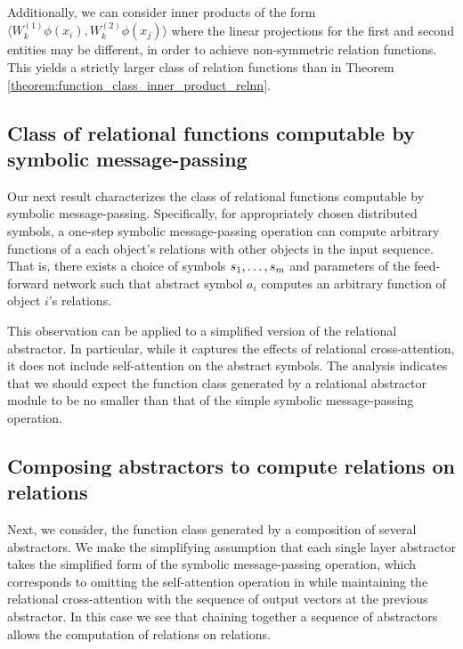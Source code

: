 Additionally, we can consider inner products of the form
$\langle W_k^{(1)} \phi(x_i), W_k^{(2)} \phi(x_j) \rangle$
where the linear projections for the first and second entities may be different, in order to achieve non-symmetric relation functions. This yields a strictly larger class of relation functions than in Theorem \ref{theorem:function_class_inner_product_relnn}.

\subsection{Class of relational functions computable by symbolic message-passing}

Our next result characterizes the class of relational functions computable by symbolic message-passing.
Specifically, for appropriately chosen distributed symbols, 
a one-step symbolic message-passing operation can compute arbitrary functions of a each object's relations with other objects in the input sequence. That is, there exists a choice of symbols \(s_1, \ldots, s _m\) and parameters of the feed-forward network such that abstract symbol \(a_i\) computes an arbitrary function of object \(i\)'s relations.

This observation can be applied to a simplified version of the relational  abstractor. In particular, while it captures the effects of relational cross-attention, it does not include self-attention on the abstract symbols. The analysis indicates that we should expect the function class generated by a relational  abstractor module to be no smaller than that of the simple symbolic message-passing operation.


\subsection{Composing  abstractors to compute relations on relations}
\label{ssec:compsing_abstractors}

Next, we consider, 
the function class generated by a composition of several abstractors. We make the simplifying assumption that each single layer abstractor takes the simplified form of the symbolic message-passing operation, which corresponds to omitting the self-attention operation in  while maintaining the relational cross-attention with the sequence of output vectors at the previous  abstractor. In this case 
we see that chaining together a sequence of  abstractors allows the computation of relations on relations.


